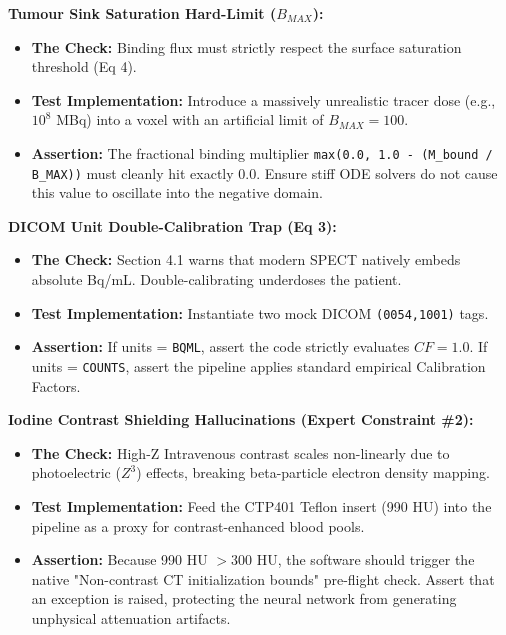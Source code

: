 \documentclass[11pt,a4paper]{article}
\begin{document}
\noindent\textbf{Tumour Sink Saturation Hard-Limit ($B_{MAX}$):}
\begin{itemize}
    \item \textbf{The Check:} Binding flux must strictly respect the surface saturation threshold (Eq 4).
    \item \textbf{Test Implementation:} Introduce a massively unrealistic tracer dose (e.g., $10^8$ MBq) into a voxel with an artificial limit of $B_{MAX} = 100$.
    \item \textbf{Assertion:} The fractional binding multiplier \texttt{max(0.0, 1.0 - (M\_bound / B\_MAX))} must cleanly hit exactly 0.0. Ensure stiff ODE solvers do not cause this value to oscillate into the negative domain.
\end{itemize}

\noindent\textbf{DICOM Unit Double-Calibration Trap (Eq 3):}
\begin{itemize}
    \item \textbf{The Check:} Section 4.1 warns that modern SPECT natively embeds absolute Bq/mL. Double-calibrating underdoses the patient.
    \item \textbf{Test Implementation:} Instantiate two mock DICOM \texttt{(0054,1001)} tags.
    \item \textbf{Assertion:} If units = \texttt{BQML}, assert the code strictly evaluates $CF = 1.0$. If units = \texttt{COUNTS}, assert the pipeline applies standard empirical Calibration Factors.
\end{itemize}

\noindent\textbf{Iodine Contrast Shielding Hallucinations (Expert Constraint \#2):}
\begin{itemize}
    \item \textbf{The Check:} High-Z Intravenous contrast scales non-linearly due to photoelectric ($Z^3$) effects, breaking beta-particle electron density mapping.
    \item \textbf{Test Implementation:} Feed the CTP401 Teflon insert (990 HU) into the pipeline as a proxy for contrast-enhanced blood pools.
    \item \textbf{Assertion:} Because 990 HU $> 300$ HU, the software should trigger the native "Non-contrast CT initialization bounds" pre-flight check. Assert that an exception is raised, protecting the neural network from generating unphysical attenuation artifacts.
\end{itemize}
\end{document}
